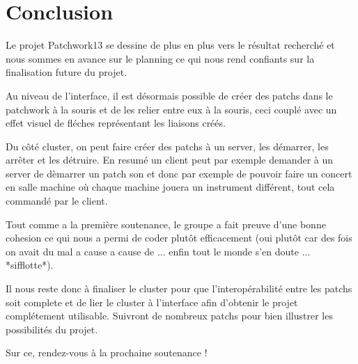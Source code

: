 \chapter{Conclusion}

Le projet Patchwork13 se dessine de plus en plus vers le r\'esultat 
recherch\'e et nous sommes en avance sur le planning ce qui nous rend confiants
sur la finalisation future du projet. 

Au niveau de l'interface, il est d\'esormais possible de cr\'eer des patchs 
dans le patchwork \`a la souris et de les relier entre eux \`a la souris, ceci 
coupl\'e avec un effet visuel de fl\'eches repr\'esentant les liaisons 
cr\'e\'es.

Du c\^ot\'e cluster, on peut faire cr\'eer des patchs \`a un server, les 
d\'emarrer, les arr\^eter et les d\'etruire. En resum\'e un client peut par
exemple demander \`a un server de d\`emarrer un patch son et donc par exemple
de pouvoir faire un concert en salle machine o\`u chaque machine jouera un 
instrument diff\'erent, tout cela command\'e par le client. 

Tout comme a la premi\`ere soutenance, le groupe a fait preuve d'une bonne 
cohesion ce qui nous a permi de coder plut\^ot efficacement (oui plut\^ot car
 des fois on avait du mal a cause a cause de ... enfin tout le monde s'en 
doute ... *sifflotte*). 

Il nous reste donc \`a finaliser le cluster pour que l'interop\'erabilit\'e 
entre les patchs soit complete et de lier le cluster à l'interface afin 
d'obtenir le projet compl\'etement utilisable. Suivront de nombreux patchs 
pour bien illustrer les possibilit\'es du projet.  

Sur ce, rendez-vous \`a la prochaine soutenance !
 
